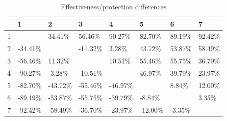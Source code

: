 \begin{table}[ht]
\centering
\begin{tabular}{rlllllll}
  \hline
 & 1 & 2 & 3 & 4 & 5 & 6 & 7 \\ 
  \hline
1 &  & 34.41\% & 56.46\% & 90.27\% & 82.70\% & 89.19\% & 92.42\% \\ 
  2 & -34.41\% &  & -11.32\% & 3.28\% & 43.72\% & 53.87\% & 58.49\% \\ 
  3 & -56.46\% & 11.32\% &  & 10.51\% & 55.46\% & 55.75\% & 36.70\% \\ 
  4 & -90.27\% & -3.28\% & -10.51\% &  & 46.97\% & 39.79\% & 23.97\% \\ 
  5 & -82.70\% & -43.72\% & -55.46\% & -46.97\% &  & 8.84\% & 12.00\% \\ 
  6 & -89.19\% & -53.87\% & -55.75\% & -39.79\% & -8.84\% &  & 3.35\% \\ 
  7 & -92.42\% & -58.49\% & -36.70\% & -23.97\% & -12.00\% & -3.35\% &  \\ 
   \hline
\end{tabular}
\caption{Effectiveness/protection differences} 
\end{table}
